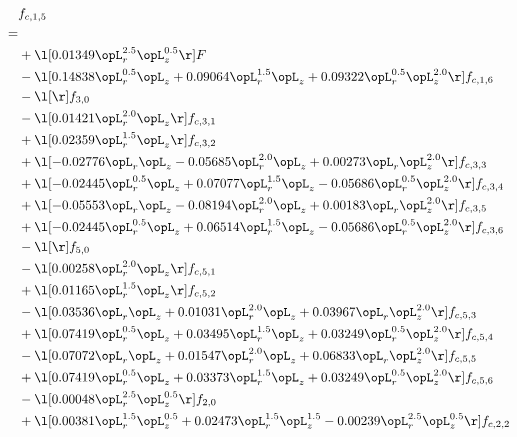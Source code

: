 \begin{alignat}{2} 
\label{eq:f_15_2} 
& f_{c,1,5} \nonumber \\ 
 = \\ 
& + \l[  0.01349 \opL_r^{2.5} \opL_z^{0.5}  \r] F \nonumber \\ 
& - \l[  0.14838 \opL_r^{0.5} \opL_z +  0.09064 \opL_r^{1.5} \opL_z +  0.09322 \opL_r^{0.5} \opL_z^{2.0}  \r] f_{c,1,6} \nonumber \\ 
& - \l[  \r] f_{3,0} \nonumber \\ 
& - \l[  0.01421 \opL_r^{2.0} \opL_z  \r] f_{c,3,1} \nonumber \\ 
& + \l[  0.02359 \opL_r^{1.5} \opL_z  \r] f_{c,3,2} \nonumber \\ 
& + \l[  -0.02776 \opL_r \opL_z   -0.05685 \opL_r^{2.0} \opL_z +  0.00273 \opL_r \opL_z^{2.0}  \r] f_{c,3,3} \nonumber \\ 
& + \l[  -0.02445 \opL_r^{0.5} \opL_z +  0.07077 \opL_r^{1.5} \opL_z   -0.05686 \opL_r^{0.5} \opL_z^{2.0}  \r] f_{c,3,4} \nonumber \\ 
& + \l[  -0.05553 \opL_r \opL_z   -0.08194 \opL_r^{2.0} \opL_z +  0.00183 \opL_r \opL_z^{2.0}  \r] f_{c,3,5} \nonumber \\ 
& + \l[  -0.02445 \opL_r^{0.5} \opL_z +  0.06514 \opL_r^{1.5} \opL_z   -0.05686 \opL_r^{0.5} \opL_z^{2.0}  \r] f_{c,3,6} \nonumber \\ 
& - \l[  \r] f_{5,0} \nonumber \\ 
& - \l[  0.00258 \opL_r^{2.0} \opL_z  \r] f_{c,5,1} \nonumber \\ 
& + \l[  0.01165 \opL_r^{1.5} \opL_z  \r] f_{c,5,2} \nonumber \\ 
& - \l[  0.03536 \opL_r \opL_z +  0.01031 \opL_r^{2.0} \opL_z +  0.03967 \opL_r \opL_z^{2.0}  \r] f_{c,5,3} \nonumber \\ 
& + \l[  0.07419 \opL_r^{0.5} \opL_z +  0.03495 \opL_r^{1.5} \opL_z +  0.03249 \opL_r^{0.5} \opL_z^{2.0}  \r] f_{c,5,4} \nonumber \\ 
& - \l[  0.07072 \opL_r \opL_z +  0.01547 \opL_r^{2.0} \opL_z +  0.06833 \opL_r \opL_z^{2.0}  \r] f_{c,5,5} \nonumber \\ 
& + \l[  0.07419 \opL_r^{0.5} \opL_z +  0.03373 \opL_r^{1.5} \opL_z +  0.03249 \opL_r^{0.5} \opL_z^{2.0}  \r] f_{c,5,6} \nonumber \\ 
& - \l[  0.00048 \opL_r^{2.5} \opL_z^{0.5}  \r] f_{2,0} \nonumber \\ 
& + \l[  0.00381 \opL_r^{1.5} \opL_z^{0.5} +  0.02473 \opL_r^{1.5} \opL_z^{1.5}   -0.00239 \opL_r^{2.5} \opL_z^{0.5}  \r] f_{c,2,2} \nonumber \\ 

\end{alignat}

